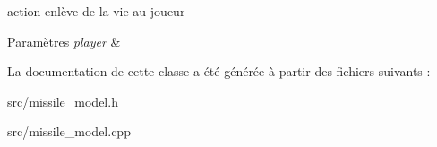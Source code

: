 action enlève de la vie au joueur 


\begin{DoxyParams}{Paramètres}
{\em player} & \\
\hline
\end{DoxyParams}


La documentation de cette classe a été générée à partir des fichiers suivants \+:\begin{DoxyCompactItemize}
\item 
src/\hyperlink{missile__model_8h}{missile\+\_\+model.\+h}\item 
src/missile\+\_\+model.\+cpp\end{DoxyCompactItemize}
